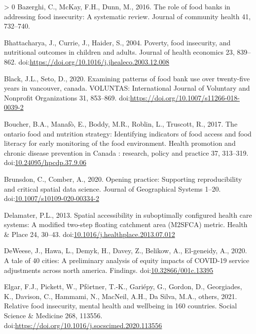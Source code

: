 \documentclass[]{elsarticle} %
\newlength{\cslhangindent}
\newenvironment{CSLReferences}[3] %
 {%
  \setlength{\parindent}{0pt}
  \ifodd #1 \everypar{\setlength{\hangindent}{\cslhangindent}}\ignorespaces\fi
  \ifnum #2 > 0
  \setlength{\parskip}{#2\baselineskip}
  \fi
 }%
 {}
\begin{document}
\hypertarget{refs}{}
\begin{CSLReferences}{1}{0}
\leavevmode\hypertarget{ref-bazerghi2016role}{}%
Bazerghi, C., McKay, F.H., Dunn, M., 2016. The role of food banks in
addressing food insecurity: A systematic review. Journal of community
health 41, 732--740.

\leavevmode\hypertarget{ref-bhattacharya2004poverty}{}%
Bhattacharya, J., Currie, J., Haider, S., 2004. Poverty, food
insecurity, and nutritional outcomes in children and adults. Journal of
health economics 23, 839--862.
doi:\url{https://doi.org/10.1016/j.jhealeco.2003.12.008}

\leavevmode\hypertarget{ref-black2020examining}{}%
Black, J.L., Seto, D., 2020. Examining patterns of food bank use over
twenty-five years in vancouver, canada. VOLUNTAS: International Journal
of Voluntary and Nonprofit Organizations 31, 853--869.
doi:\url{https://doi.org/10.1007/s11266-018-0039-2}

\leavevmode\hypertarget{ref-boucher2017ontario}{}%
Boucher, B.A., Manafò, E., Boddy, M.R., Roblin, L., Truscott, R., 2017.
The ontario food and nutrition strategy: Identifying indicators of food
access and food literacy for early monitoring of the food environment.
Health promotion and chronic disease prevention in Canada : research,
policy and practice 37, 313--319.
doi:\href{https://doi.org/10.24095/hpcdp.37.9.06}{10.24095/hpcdp.37.9.06}

\leavevmode\hypertarget{ref-brunsdon2020opening}{}%
Brunsdon, C., Comber, A., 2020. Opening practice: Supporting
reproducibility and critical spatial data science. Journal of
Geographical Systems 1--20.
doi:\href{https://doi.org/10.1007/s10109-020-00334-2}{10.1007/s10109-020-00334-2}

\leavevmode\hypertarget{ref-delamater2013spatial}{}%
Delamater, P.L., 2013. Spatial accessibility in suboptimally configured
health care systems: A modified two-step floating catchment area
(M2SFCA) metric. Health \& Place 24, 30--43.
doi:\href{https://doi.org/10.1016/j.healthplace.2013.07.012}{10.1016/j.healthplace.2013.07.012}

\leavevmode\hypertarget{ref-deweese2020tale}{}%
DeWeese, J., Hawa, L., Demyk, H., Davey, Z., Belikow, A., El-geneidy,
A., 2020. A tale of 40 cities: A preliminary analysis of equity impacts
of COVID-19 service adjustments across north america. Findings.
doi:\href{https://doi.org/10.32866/001c.13395}{10.32866/001c.13395}

\leavevmode\hypertarget{ref-elgar2021relative}{}%
Elgar, F.J., Pickett, W., Pförtner, T.-K., Gariépy, G., Gordon, D.,
Georgiades, K., Davison, C., Hammami, N., MacNeil, A.H., Da Silva, M.A.,
others, 2021. Relative food insecurity, mental health and wellbeing in
160 countries. Social Science \& Medicine 268, 113556.
doi:\url{https://doi.org/10.1016/j.socscimed.2020.113556}


\end{CSLReferences}
\end{document}
